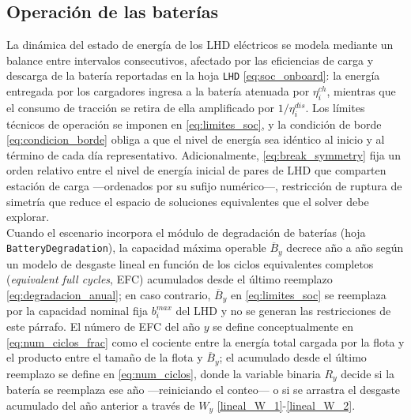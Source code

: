 \documentclass[11pt]{article}
\providecommand{\Bar}{}
\renewcommand{\Bar}[1]{\overline{#1}}
\begin{document}
\subsection{Operación de las baterías}

La dinámica del estado de energía de los LHD eléctricos se modela mediante un balance entre intervalos consecutivos, afectado por las eficiencias de carga y descarga de la batería reportadas en la hoja \texttt{LHD} \eqref{eq:soc_onboard}: la energía entregada por los cargadores ingresa a la batería atenuada por $\eta^{ch}_i$, mientras que el consumo de tracción se retira de ella amplificado por $1/\eta^{dis}_i$. Los límites técnicos de operación se imponen en \eqref{eq:limites_soc}, y la condición de borde \eqref{eq:condicion_borde} obliga a que el nivel de energía sea idéntico al inicio y al término de cada día representativo. Adicionalmente, \eqref{eq:break_symmetry} fija un orden relativo entre el nivel de energía inicial de pares de LHD que comparten estación de carga —ordenados por su sufijo numérico—, restricción de ruptura de simetría que reduce el espacio de soluciones equivalentes que el solver debe explorar.\\

Cuando el escenario incorpora el módulo de degradación de baterías (hoja \texttt{BatteryDegradation}), la capacidad máxima operable $\Bar{B}_y$ decrece año a año según un modelo de desgaste lineal en función de los ciclos equivalentes completos (\textit{equivalent full cycles}, EFC) acumulados desde el último reemplazo \eqref{eq:degradacion_anual}; en caso contrario, $\Bar{B}_y$ en \eqref{eq:limites_soc} se reemplaza por la capacidad nominal fija $b^{max}_i$ del LHD y no se generan las restricciones de este párrafo. El número de EFC del año $y$ se define conceptualmente en \eqref{eq:num_ciclos_frac} como el cociente entre la energía total cargada por la flota y el producto entre el tamaño de la flota y $\Bar{B}_y$; el acumulado desde el último reemplazo se define en \eqref{eq:num_ciclos}, donde la variable binaria $R_y$ decide si la batería se reemplaza ese año —reiniciando el conteo— o si se arrastra el desgaste acumulado del año anterior a través de $W_y$ \eqref{lineal_W_1}-\eqref{lineal_W_2}.\\
\end{document}
